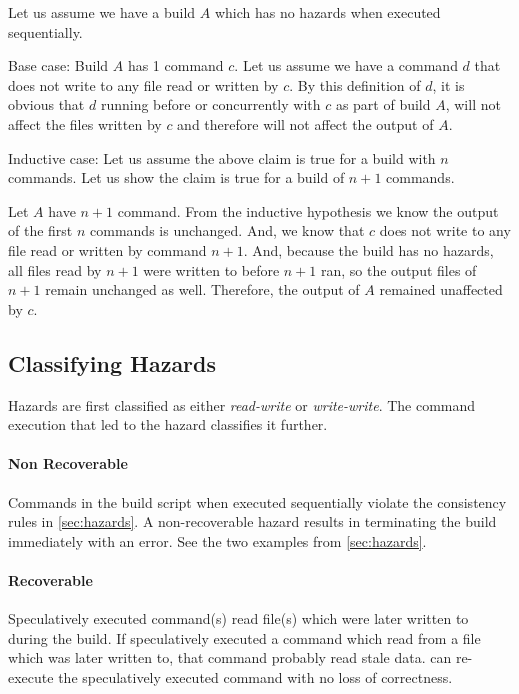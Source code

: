 Let us assume we have a build $A$ which has no hazards when executed sequentially.

Base case:  Build $A$ has 1 command $c$.  Let us assume we have a command $d$ that does not write to any file read or written by $c$.  By this definition of $d$, it is obvious that $d$ running before or
concurrently with $c$ as part of build $A$, will not affect the files written by $c$ and therefore will not affect the output of $A$.

Inductive case: Let us assume the above claim is true for a build with $n$ commands.  Let us show the claim is true for a build of $n+1$ commands.

Let $A$ have $n+1$ command.  From the inductive hypothesis we know the output of the first $n$ commands is unchanged.  And, we know that $c$ does not write to any file read or written by command $n+1$.  And, because the build has no hazards, all files read by $n+1$ were written to before $n+1$ ran, so the output files of $n+1$ remain unchanged as well.  Therefore, the output of $A$ remained unaffected by $c$.

\subsection{Classifying Hazards}
\label{sec:proof:classify_hazard}

Hazards are first classified as either \emph{read-write} or \emph{write-write}.  The command execution that led to the hazard classifies it further.

\paragraph{Non Recoverable}
Commands in the build script when executed sequentially violate the consistency rules in \ref{sec:hazards}.  A non-recoverable hazard results in \Rattle terminating the build immediately with an error.  See the two examples from \ref{sec:hazards}.


\paragraph{Recoverable}
Speculatively executed command(s) read file(s) which were later written to during the build.  If \Rattle speculatively executed a command which read from a file which was later written to, that command
probably read stale data.  \Rattle can re-execute the speculatively executed command with no loss of correctness.


